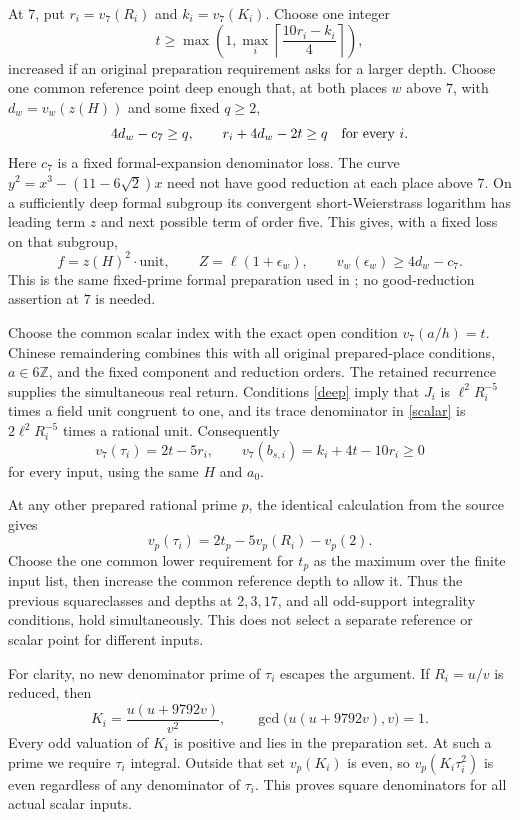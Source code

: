 \documentclass[11pt]{article}
\newcommand{\Z}{\mathbb Z}
\begin{document}
At $7$, put $r_i=v_7(R_i)$ and $k_i=v_7(K_i)$. Choose one integer
\begin{equation}\label{tchoice}
 t\ge\max\left(1,\max_i\left\lceil\frac{10r_i-k_i}{4}\right\rceil\right),
\end{equation}
increased if an original preparation requirement asks for a larger
depth. Choose one common reference point deep enough that, at both
places $w$ above $7$, with $d_w=v_w(z(H))$ and some fixed $q\ge2$,
\begin{equation}\label{deep}
 4d_w-c_7\ge q,\qquad r_i+4d_w-2t\ge q\quad\hbox{for every }i.
\end{equation}
Here $c_7$ is a fixed formal-expansion denominator loss. The curve
$y^2=x^3-(11-6\sqrt2)x$ need not have good reduction at each place
above $7$. On a sufficiently deep formal subgroup its convergent
short-Weierstrass logarithm has leading term $z$ and next possible
term of order five. This gives, with a fixed loss on that subgroup,
\[
 f=z(H)^2\cdot\text{unit},\qquad
 Z=\ell(1+\epsilon_w),\qquad v_w(\epsilon_w)\ge4d_w-c_7.
\]
This is the same fixed-prime formal preparation used in
\cite[Section~7]{v82}; no good-reduction assertion at $7$ is needed.

Choose the common scalar index with the exact open condition
$v_7(a/h)=t$. Chinese remaindering combines this with all original
prepared-place conditions, $a\in6\Z$, and the fixed component and
reduction orders. The retained recurrence supplies the simultaneous
real return. Conditions \eqref{deep} imply that $J_i$ is
$\ell^2R_i^{-5}$ times a field unit congruent to one, and its trace
denominator in \eqref{scalar} is $2\ell^2R_i^{-5}$ times a rational
unit. Consequently
\begin{equation}\label{depth}
 v_7(\tau_i)=2t-5r_i,\qquad
 v_7(b_{s,i})=k_i+4t-10r_i\ge0
\end{equation}
for every input, using the same $H$ and $a_0$.

At any other prepared rational prime $p$, the identical calculation
from the source gives
\[
 v_p(\tau_i)=2t_p-5v_p(R_i)-v_p(2).
\]
Choose the one common lower requirement for $t_p$ as the maximum
over the finite input list, then increase the common reference
depth to allow it. Thus the previous squareclasses and depths at
$2,3,17$, and all odd-support integrality conditions, hold
simultaneously. This does not select a separate reference or scalar
point for different inputs.

For clarity, no new denominator prime of $\tau_i$ escapes the
argument. If $R_i=u/v$ is reduced, then
\[
 K_i=\frac{u(u+9792v)}{v^2},\qquad
 \gcd\bigl(u(u+9792v),v\bigr)=1.
\]
Every odd valuation of $K_i$ is positive and lies in the preparation
set. At such a prime we require $\tau_i$ integral. Outside that set
$v_p(K_i)$ is even, so $v_p(K_i\tau_i^2)$ is even regardless of
any denominator of $\tau_i$. This proves square denominators for
all actual scalar inputs.
\end{document}
